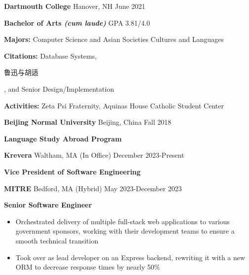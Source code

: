 \documentclass[10pt,a4paper,ragged2e,withhyper]{altacv}
\begin{document}
\begin{paracol}{2}


    \large\color{emphasis}\textbf{Dartmouth College} \small\faUniversity Hanover, NH
    \hfill\small\faGraduationCap June 2021\par
    \textbf{\color{subheading}Bachelor of Arts \textit{(cum laude)}} \hfill GPA 3.81/4.0\par
    \textbf{Majors:} Computer Science and Asian Societies Cultures and Languages \par
    \textbf{Citations:} Database Systems, \begin{CJK*}{UTF8}{gbsn}鲁迅与胡适\end{CJK*}, and Senior Design/Implementation \par
    \textbf{Activities:} Zeta Psi Fraternity, Aquinas House Catholic Student Center \par
    \medskip
    \large\color{emphasis}\textbf{Beijing Normal University} \small\faUniversity Beijing, China
    \hfill\small\faGraduationCap Fall 2018\par
    \textbf{\color{subheading}Language Study Abroad Program}\par


    \large\color{emphasis}\textbf{Krevera} \small\faBuilding Waltham, MA (In Office)
    \hfill\small\faCalendar December 2023-Present\par
    \textbf{\color{subheading}Vice President of Software Engineering}\par
    \smallskip
    \normalsize

    \divider

    \large\color{emphasis}\textbf{MITRE} \small\faSuitcase Bedford, MA (Hybrid)
    \hfill\small\faCalendar May 2023-December 2023\par
    \textbf{\color{subheading}Senior Software Engineer}\par
    \smallskip
    \normalsize

    \begin{itemize}
        \item Orchestrated delivery of multiple full-stack web applications to various government sponsors, working with their development teams to ensure a smooth technical transition
        \item Took over as lead developer on an Express backend, rewriting it with a new ORM to decrease response times by nearly 50\%
    \end{itemize}


\end{paracol}
\end{document}
